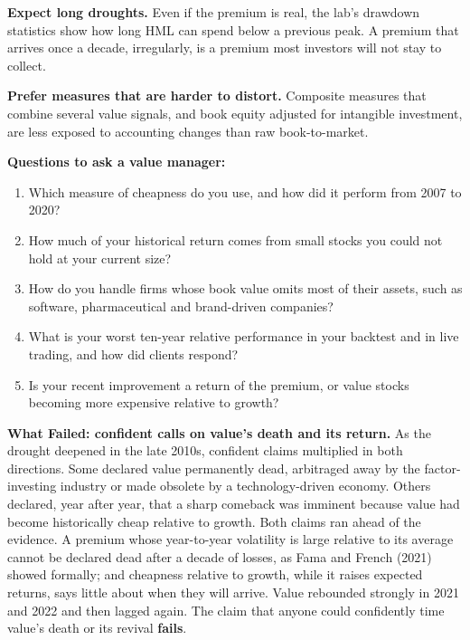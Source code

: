 \textbf{Expect long droughts.} Even if the premium is real, the lab's drawdown statistics show how long HML can spend below a previous peak. A premium that arrives once a decade, irregularly, is a premium most investors will not stay to collect.

\textbf{Prefer measures that are harder to distort.} Composite measures that combine several value signals, and book equity adjusted for intangible investment, are less exposed to accounting changes than raw book-to-market.

\textbf{Questions to ask a value manager:}

\begin{enumerate}
  \item Which measure of cheapness do you use, and how did it perform from 2007 to 2020?
  \item How much of your historical return comes from small stocks you could not hold at your current size?
  \item How do you handle firms whose book value omits most of their assets, such as software, pharmaceutical and brand-driven companies?
  \item What is your worst ten-year relative performance in your backtest and in live trading, and how did clients respond?
  \item Is your recent improvement a return of the premium, or value stocks becoming more expensive relative to growth?
\end{enumerate}

\begin{callout}
\textbf{What Failed: confident calls on value's death and its return.} As the drought deepened in the late 2010s, confident claims multiplied in both directions. Some declared value permanently dead, arbitraged away by the factor-investing industry or made obsolete by a technology-driven economy. Others declared, year after year, that a sharp comeback was imminent because value had become historically cheap relative to growth. Both claims ran ahead of the evidence. A premium whose year-to-year volatility is large relative to its average cannot be declared dead after a decade of losses, as Fama and French (2021) showed formally; and cheapness relative to growth, while it raises expected returns, says little about when they will arrive. Value rebounded strongly in 2021 and 2022 and then lagged again. The claim that anyone could confidently time value's death or its revival \textbf{fails}.
\end{callout}

